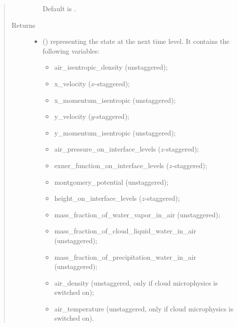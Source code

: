 \documentclass[letterpaper,10pt,english]{sphinxmanual}
\begin{document}
\begin{fulllineitems}
\begin{fulllineitems}
\begin{quote}
\begin{description}
\begin{itemize}
\begin{itemize}
\end{itemize}

Default is .


\end{itemize}

\item[{Returns}] \leavevmode
\begin{itemize}
\item {} 
 () \textendash{} {\hyperref[\detokenize{api:storages.state_isentropic.StateIsentropic}]{}} representing the state at the next time level.
It contains the following variables:
\begin{itemize}
\item {} 
air\_isentropic\_density (unstaggered);

\item {} 
x\_velocity (\(x\)-staggered);

\item {} 
x\_momentum\_isentropic (unstaggered);

\item {} 
y\_velocity (\(y\)-staggered);

\item {} 
y\_momentum\_isentropic (unstaggered);

\item {} 
air\_pressure\_on\_interface\_levels (\(z\)-staggered);

\item {} 
exner\_function\_on\_interface\_levels (\(z\)-staggered);

\item {} 
montgomery\_potential (unstaggered);

\item {} 
height\_on\_interface\_levels (\(z\)-staggered);

\item {} 
mass\_fraction\_of\_water\_vapor\_in\_air (unstaggered);

\item {} 
mass\_fraction\_of\_cloud\_liquid\_water\_in\_air (unstaggered);

\item {} 
mass\_fraction\_of\_precipitation\_water\_in\_air (unstaggered);

\item {} 
air\_density (unstaggered, only if cloud microphysics is switched on);

\item {} 
air\_temperature (unstaggered, only if cloud microphysics is switched on).


\end{itemize}
\end{itemize}
\end{description}
\end{quote}
\end{fulllineitems}
\end{fulllineitems}
\end{document}
